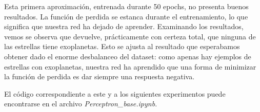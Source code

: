 Esta primera aproximación, entrenada durante 50 epochs, no presenta buenos resultados. La función de perdida se estanca durante el entrenamiento, lo que significa que nuestra red ha dejado de aprender. Examinando los resultados, vemos se observa que devuelve, prácticamente con certeza total, que ninguna de las estrellas tiene exoplanetas. Esto se ajusta al resultado que esperabamos obtener dado el enorme desbalanceo del dataset: como apenas hay ejemplos de estrellas con exoplanetas, nuestra red ha aprendido que una forma de minimizar la función de perdida es dar siempre una respuesta negativa.


El código correspondiente a este y a los siguientes experimentos puede encontrarse en el archivo \textit{Perceptron\_base.ipynb}.

